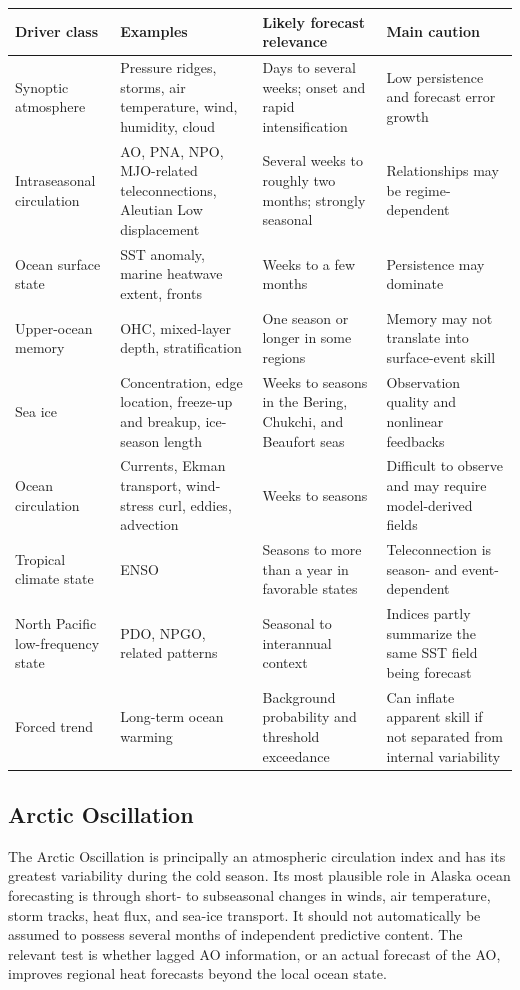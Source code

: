\documentclass[11pt]{article}
\newcommand{\MHW}{marine heatwave}
\begin{document}
\small
\begin{longtable}{@{}p{}p{}p{}p{}@{}}
\toprule
\textbf{Driver class} & \textbf{Examples} & \textbf{Likely forecast relevance} & \textbf{Main caution} \\
\midrule
Synoptic atmosphere & Pressure ridges, storms, air temperature, wind, humidity, cloud & Days to several weeks; onset and rapid intensification & Low persistence and forecast error growth \\
\addlinespace
Intraseasonal circulation & AO, PNA, NPO, MJO-related teleconnections, Aleutian Low displacement & Several weeks to roughly two months; strongly seasonal & Relationships may be regime-dependent \\
\addlinespace
Ocean surface state & SST anomaly, \MHW{} extent, fronts & Weeks to a few months & Persistence may dominate \\
\addlinespace
Upper-ocean memory & OHC, mixed-layer depth, stratification & One season or longer in some regions & Memory may not translate into surface-event skill \\
\addlinespace
Sea ice & Concentration, edge location, freeze-up and breakup, ice-season length & Weeks to seasons in the Bering, Chukchi, and Beaufort seas & Observation quality and nonlinear feedbacks \\
\addlinespace
Ocean circulation & Currents, Ekman transport, wind-stress curl, eddies, advection & Weeks to seasons & Difficult to observe and may require model-derived fields \\
\addlinespace
Tropical climate state & ENSO & Seasons to more than a year in favorable states & Teleconnection is season- and event-dependent \\
\addlinespace
North Pacific low-frequency state & PDO, NPGO, related patterns & Seasonal to interannual context & Indices partly summarize the same SST field being forecast \\
\addlinespace
Forced trend & Long-term ocean warming & Background probability and threshold exceedance & Can inflate apparent skill if not separated from internal variability \\
\bottomrule
\end{longtable}
\normalsize

\subsection{Arctic Oscillation}

The Arctic Oscillation is principally an atmospheric circulation index and has its greatest variability during the cold season. Its most plausible role in Alaska ocean forecasting is through short- to subseasonal changes in winds, air temperature, storm tracks, heat flux, and sea-ice transport. It should not automatically be assumed to possess several months of independent predictive content. The relevant test is whether lagged AO information, or an actual forecast of the AO, improves regional heat forecasts beyond the local ocean state.
\end{document}
